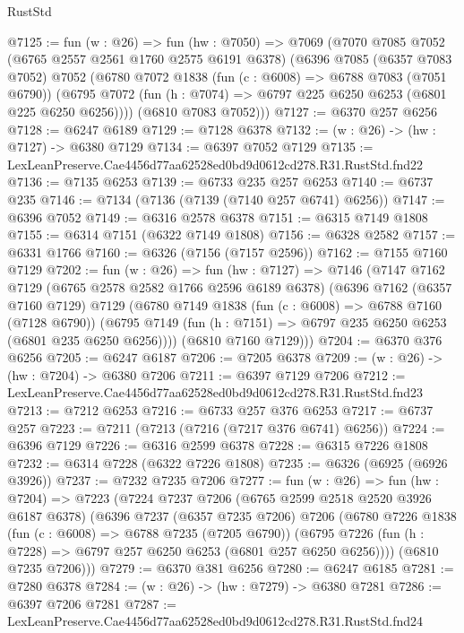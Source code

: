 \begin{lexlean}{RustStd}
\begin{coremodule}
@7125 := fun (w : @26) =>
  fun (hw : @7050) =>
  @7069
    (@7070
      @7085
      @7052
      (@6765 @2557 @2561 @1760 @2575 @6191 @6378)
      (@6396
        @7085
        (@6357 @7083 @7052)
        @7052
        (@6780
          @7072
          @1838
          (fun (c : @6008) => @6788 @7083 (@7051 @6790))
          (@6795 @7072 (fun (h : @7074) => @6797 @225 @6250 @6253 (@6801 @225 @6250 @6256))))
        (@6810 @7083 @7052)))
@7127 := @6370 @257 @6256
@7128 := @6247 @6189
@7129 := @7128 @6378
@7132 := (w : @26) -> (hw : @7127) -> @6380 @7129
@7134 := @6397 @7052 @7129
@7135 := LexLeanPreserve.Cae4456d77aa62528ed0bd9d0612cd278.R31.RustStd.fnd22
@7136 := @7135 @6253
@7139 := @6733 @235 @257 @6253
@7140 := @6737 @235
@7146 := @7134 (@7136 (@7139 (@7140 @257 @6741) @6256))
@7147 := @6396 @7052
@7149 := @6316 @2578 @6378
@7151 := @6315 @7149 @1808
@7155 := @6314 @7151 (@6322 @7149 @1808)
@7156 := @6328 @2582
@7157 := @6331 @1766
@7160 := @6326 (@7156 (@7157 @2596))
@7162 := @7155 @7160 @7129
@7202 := fun (w : @26) =>
  fun (hw : @7127) =>
  @7146
    (@7147
      @7162
      @7129
      (@6765 @2578 @2582 @1766 @2596 @6189 @6378)
      (@6396
        @7162
        (@6357 @7160 @7129)
        @7129
        (@6780
          @7149
          @1838
          (fun (c : @6008) => @6788 @7160 (@7128 @6790))
          (@6795 @7149 (fun (h : @7151) => @6797 @235 @6250 @6253 (@6801 @235 @6250 @6256))))
        (@6810 @7160 @7129)))
@7204 := @6370 @376 @6256
@7205 := @6247 @6187
@7206 := @7205 @6378
@7209 := (w : @26) -> (hw : @7204) -> @6380 @7206
@7211 := @6397 @7129 @7206
@7212 := LexLeanPreserve.Cae4456d77aa62528ed0bd9d0612cd278.R31.RustStd.fnd23
@7213 := @7212 @6253
@7216 := @6733 @257 @376 @6253
@7217 := @6737 @257
@7223 := @7211 (@7213 (@7216 (@7217 @376 @6741) @6256))
@7224 := @6396 @7129
@7226 := @6316 @2599 @6378
@7228 := @6315 @7226 @1808
@7232 := @6314 @7228 (@6322 @7226 @1808)
@7235 := @6326 (@6925 (@6926 @3926))
@7237 := @7232 @7235 @7206
@7277 := fun (w : @26) =>
  fun (hw : @7204) =>
  @7223
    (@7224
      @7237
      @7206
      (@6765 @2599 @2518 @2520 @3926 @6187 @6378)
      (@6396
        @7237
        (@6357 @7235 @7206)
        @7206
        (@6780
          @7226
          @1838
          (fun (c : @6008) => @6788 @7235 (@7205 @6790))
          (@6795 @7226 (fun (h : @7228) => @6797 @257 @6250 @6253 (@6801 @257 @6250 @6256))))
        (@6810 @7235 @7206)))
@7279 := @6370 @381 @6256
@7280 := @6247 @6185
@7281 := @7280 @6378
@7284 := (w : @26) -> (hw : @7279) -> @6380 @7281
@7286 := @6397 @7206 @7281
@7287 := LexLeanPreserve.Cae4456d77aa62528ed0bd9d0612cd278.R31.RustStd.fnd24

\end{coremodule}
\end{lexlean}
